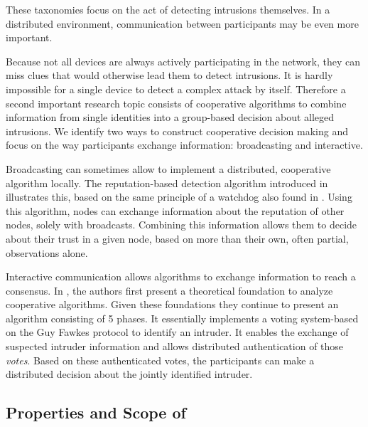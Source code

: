 \documentclass[conference]{IEEEtran}
\begin{document}
These taxonomies focus on the act of detecting intrusions themselves. In a
distributed environment, communication between participants may be even more
important.

Because not all devices are always actively participating in the network, they
can miss clues that would otherwise lead them to detect intrusions. It is
hardly impossible for a single device to detect a complex attack by itself.
Therefore a second important research topic consists of cooperative algorithms
to combine information from single identities into a group-based decision about
alleged intrusions. We identify two ways to construct cooperative decision
making and focus on the way participants exchange information: broadcasting and
interactive.

\begin{LaTeXdescription}

  \item[Broadcasting] can sometimes allow to implement a distributed,
  cooperative algorithm locally. The reputation-based detection algorithm
  introduced in \cite{ganeriwal2008reputation} illustrates this, based on the
  same principle of a watchdog also found in \cite{mishra2004intrusion}. Using
  this algorithm, nodes can exchange information about the reputation of other
  nodes, solely with broadcasts. Combining this information allows them to
  decide about their trust in a given node, based on more than their own, often
  partial, observations alone.

  \item[Interactive] communication allows algorithms to exchange information to
  reach a consensus. In \cite{krontiris2009cooperative}, the authors first
  present a theoretical foundation to analyze cooperative algorithms. Given
  these foundations they continue to present an algorithm consisting of 5
  phases. It essentially implements a voting system-based on the Guy Fawkes
  protocol \cite{anderson1998new} to identify an intruder. It enables the
  exchange of suspected intruder information and allows distributed
  authentication of those \emph{votes}. Based on these authenticated votes, the
  participants can make a distributed decision about the jointly identified
  intruder.

\end{LaTeXdescription}

\subsection{Properties and Scope of \NAME}
\label{scope}
\end{document}
